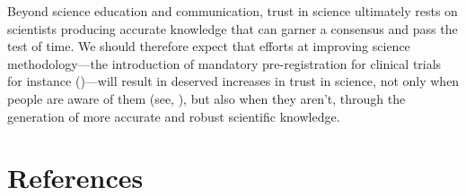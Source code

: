 \documentclass[
  jou,
  floatsintext,
  longtable,
  nolmodern,
  notxfonts,
  notimes,
  colorlinks=true,linkcolor=blue,citecolor=blue,urlcolor=blue]{apa7}
\begin{document}
Beyond science education and communication, trust in science ultimately
rests on scientists producing accurate knowledge that can garner a
consensus and pass the test of time. We should therefore expect that
efforts at improving science methodology---the introduction of mandatory
pre-registration for clinical trials for instance
()---will result in deserved increases in trust in science, not only
when people are aware of them (see,
), but
also when they aren't, through the generation of more accurate and
robust scientific knowledge.

\section{References}\label{references}
\end{document}
